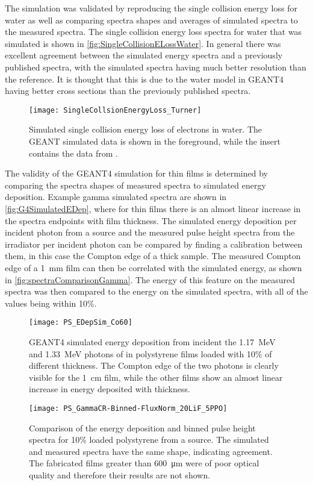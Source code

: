 The simulation was validated by reproducing the single collision energy loss for water as well as comparing spectra shapes and averages of simulated spectra to the measured spectra.
The single collision energy loss spectra for water that was simulated is shown in \autoref{fig:SingleCollisionELossWater}.
In general there was excellent agreement between the simulated energy spectra and a previously published spectra\cite{turner_comparative_1982}, with the simulated spectra having much better resolution than the reference.
It is thought that this is due to the water model in GEANT4 having better cross sections than the previously published spectra.
\begin{figure}
  \centering
  \texttt{[image: SingleCollsionEnergyLoss\_Turner]}
  \caption[Single Collision Energy Loss of Water]{Simulated single collision energy loss of electrons in water. The GEANT simulated data is shown in the foreground, while the insert contains the data from \cite{turner_comparative_1982}.}
	\label{fig:SingleCollisionELossWater}
\end{figure}

The validity of the GEANT4 simulation for thin films is determined by comparing the spectra shapes of measured spectra to simulated energy deposition.
Example gamma simulated spectra are shown in \autoref{fig:G4SimulatedEDep}, where for thin films there is an almost linear increase in the spectra endpoints with film thickness.
The simulated energy deposition per incident photon from a  source and the measured pulse height spectra from the  irradiator per incident photon can be compared by finding a calibration between them, in this case the Compton edge of a thick sample.
The measured Compton edge of a \SI{1}{\mm} film can then be correlated with the simulated energy, as shown in \autoref{fig:spectraComparisonGamma}.
The energy of this feature on the measured spectra was then compared to the energy on the simulated spectra, with all of the values being within 10\%.
\begin{figure}
	\centering
    	\texttt{[image: PS\_EDepSim\_Co60]}
	\caption[GEANT4 Simulated Gamma Spectra in PS]{GEANT4 simulated energy deposition from incident the \SI{1.17}{\MeV} and \SI{1.33}{\MeV} photons of  in polystyrene films loaded with 10\%  of different thickness. The Compton edge of the two photons is clearly visible for the \SI{1}{\cm} film, while the other films show an almost linear increase in energy deposited with thickness.}
	\label{fig:G4SimulatedEDep}
\end{figure}
\begin{figure}
	\centering
   	\texttt{[image: PS\_GammaCR-Binned-FluxNorm\_20LiF\_5PPO]}
	\caption[Comparison of Energy Deposition and Binned Hulse Height Spectra]{Comparison of the energy deposition and binned pulse height spectra for 10\% loaded polystyrene from a  source. The simulated and measured spectra have the same shape, indicating agreement. The fabricated films greater than \SI{600}{\um} were of poor optical quality and therefore their results are not shown. }
	\label{fig:spectraComparisonGamma}
\end{figure}

